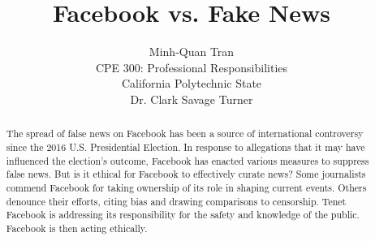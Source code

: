 

\title{\vfill Facebook vs. Fake News\\
\vspace{8pt}
\normalsize{}
}

\author{Minh-Quan Tran\\
\normalsize{CPE 300: Professional Responsibilities}\\
\normalsize{California Polytechnic State}\\
\normalsize{Dr. Clark Savage Turner}
}

\maketitle


\vfill

\begin{abstract}
The spread of false news on Facebook has been a source of international controversy since the 2016 U.S. Presidential Election. \cite{telegraph_fake_news} In response to allegations that it may have influenced the election's outcome, \cite{tc_snowden_fb,stanford_fake_news_study} Facebook has enacted various measures to suppress false news. \cite{fb_addressing_hoaxes,guardian_fb_tips} But is it ethical for Facebook to effectively curate news? Some journalists commend Facebook for taking ownership of its role in shaping current events. \cite{cnn_fight} Others denounce their efforts,  citing bias \cite{vox_sentences_fn} and drawing comparisons to censorship. \cite{milo_censor} Tenet Facebook is addressing its responsibility for the safety and knowledge of the public. \cite{se_code} Facebook is then acting ethically.
\end{abstract}

\thispagestyle{empty} 
\pagebreak
